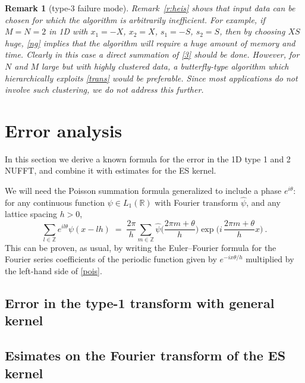 \documentclass[10pt]{article}
\newcommand{\be}{\begin{equation}}
\newcommand{\ee}{\end{equation}}
\newcommand{\RR}{\mathbb{R}}
\newcommand{\ZZ}{\mathbb{Z}}
\newtheorem{rmk}[thm]{Remark}
\begin{document}
\begin{rmk}[type-3 failure mode]
  Remark~\ref{r:heis} shows that input data can be chosen for which the
  algorithm is arbitrarily inefficient.
  For example, if $M=N=2$ in 1D with $x_1=-X$, $x_2=X$, $s_1=-S$, $s_2=S$,
  then by choosing $XS$ huge, \eqref{ng} implies that the algorithm
  will require a huge amount of memory and time.
  Clearly in this case a direct summation of \eqref{3} should be done.
  However, for $N$ and $M$ large but with highly clustered data,
  a butterfly-type algorithm which hierarchically exploits \eqref{trans}
  would be preferable. Since most applications do not involve such clustering,
  we do not address this further.
\end{rmk}




\section{Error analysis}

In this section we derive a known formula
\cite{fourmont,nfft} \cite[Sec.~V.B]{fessler}
for the error in the 1D type 1 and 2 NUFFT, and combine it with
estimates for the ES kernel.

We will need the
Poisson summation formula
\cite{apostol} generalized to include a phase $e^{i\theta}$:
for any continuous function
$\psi \in L_1(\RR)$ with Fourier transform $\hat\psi$,
and any lattice spacing $h>0$,
\be
\sum_{l\in\ZZ} e^{il\theta} \psi(x - lh) \; = \;
\frac{2\pi}{h} \sum_{m\in\ZZ}
\hat\psi\biggl(\frac{2\pi m + \theta}{h}\biggr)
\exp \biggl({i\,\frac{2\pi m + \theta}{h}x}\biggr)
~.
\label{pois}
\ee
This can be proven, as usual, by writing the Euler--Fourier
formula for the Fourier series coefficients
of the periodic function given by $e^{-ix\theta/h}$
multiplied by the left-hand side of \eqref{pois}.


\subsection{Error in the type-1 transform with general kernel}
\label{s:err}








\subsection{Esimates on the Fourier transform of the ES kernel}
\end{document}
